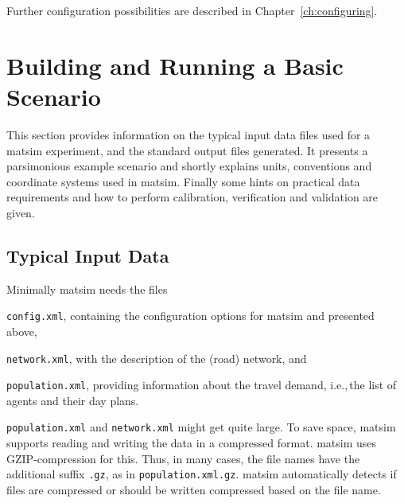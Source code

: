 Further configuration possibilities are described in Chapter~\ref{ch:configuring}.

\section{Building and Running a Basic Scenario}
\label{sec:buildingbasicscenario}
This section provides information on the typical input data files used for a \gls{matsim} experiment, and the standard output files generated. It presents a parsimonious example scenario and shortly explains units, conventions and coordinate systems used in \gls{matsim}. Finally some hints on practical data requirements and how to perform calibration, verification and validation are given.

\subsection{Typical Input Data}
\label{sec:inputdata}
Minimally \gls{matsim} needs the files
\begin{compactitem}
	\item \lstinline|config.xml|, containing the configuration options for \gls{matsim} and presented above,
	\item \lstinline|network.xml|, with the description of the (road) network, and
	\item \lstinline|population.xml|, providing information about	the travel demand, i.e.,\,the list of agents and their day plans.
\end{compactitem}

 

\lstinline|population.xml| and \lstinline|network.xml| 
might get quite large. To save space, \gls{matsim} supports reading and writing the data in a compressed format. \gls{matsim} uses GZIP-compression for this. Thus, in many cases, the file names have the additional suffix \lstinline|.gz|, as in \lstinline|population.xml.gz|. \gls{matsim} automatically detects if files are compressed or should be written compressed based on the file name.

